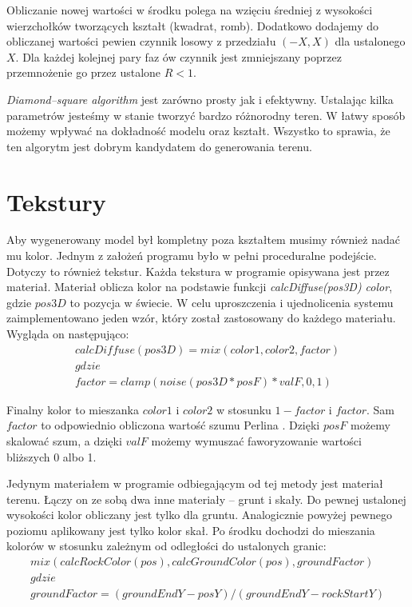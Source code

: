 \documentclass[inz,shortabstract]{iithesis}
\begin{document}
        Obliczanie nowej wartości w środku polega na wzięciu średniej z wysokości wierzchołków tworzących kształt (kwadrat, romb). Dodatkowo dodajemy do obliczanej wartości pewien czynnik losowy z przedziału $(-X, X)$ dla ustalonego $X$. Dla każdej kolejnej pary faz ów czynnik jest zmniejszany poprzez przemnożenie go przez ustalone $R < 1$.
        
        \textit{Diamond--square algorithm} jest zarówno prosty jak i efektywny. Ustalając kilka parametrów jesteśmy w stanie tworzyć bardzo różnorodny teren. W łatwy sposób możemy wpływać na dokładność modelu oraz kształt. Wszystko to sprawia, że ten algorytm jest dobrym kandydatem do generowania terenu.
        
    \section{Tekstury}
        Aby wygenerowany model był kompletny poza kształtem musimy również nadać mu kolor. Jednym z założeń programu było w pełni proceduralne podejście. Dotyczy to również tekstur. Każda tekstura w programie opisywana jest przez materiał. Materiał oblicza kolor na podstawie funkcji \textit{calcDiffuse(pos3D) \textrightarrow color}, gdzie $pos3D$ to pozycja w świecie. W celu uproszczenia i ujednolicenia systemu zaimplementowano jeden wzór, który został zastosowany do każdego materiału. Wygląda on następująco:
        \begin{gather*} \label{eqn:material}
            calcDiffuse(pos3D) = mix(color1, color2, factor) \\
            gdzie \\
            factor = clamp(noise(pos3D * posF) * valF, 0, 1)
        \end{gather*}
        

        Finalny kolor to mieszanka $color1$ i $color2$ w stosunku $1 - factor$ i $factor$. Sam $factor$ to odpowiednio obliczona wartość szumu Perlina \cite{perlinNoise}. Dzięki $posF$ możemy skalować szum, a dzięki $valF$ możemy wymuszać faworyzowanie wartości bliższych 0 albo 1.
        
        Jedynym materiałem w programie odbiegającym od tej metody jest materiał terenu. Łączy on ze sobą dwa inne materiały -- grunt i skały. Do pewnej ustalonej wysokości kolor obliczany jest tylko dla gruntu. Analogicznie powyżej pewnego poziomu aplikowany jest tylko kolor skał. Po środku dochodzi do mieszania kolorów w stosunku zależnym od odległości do ustalonych granic:
        \begin{gather*}
        mix(calcRockColor(pos), calcGroundColor(pos), groundFactor) \\
        gdzie \\
        groundFactor = (groundEndY - posY) / (groundEndY - rockStartY) \\
        \end{gather*}
        
\end{document}
